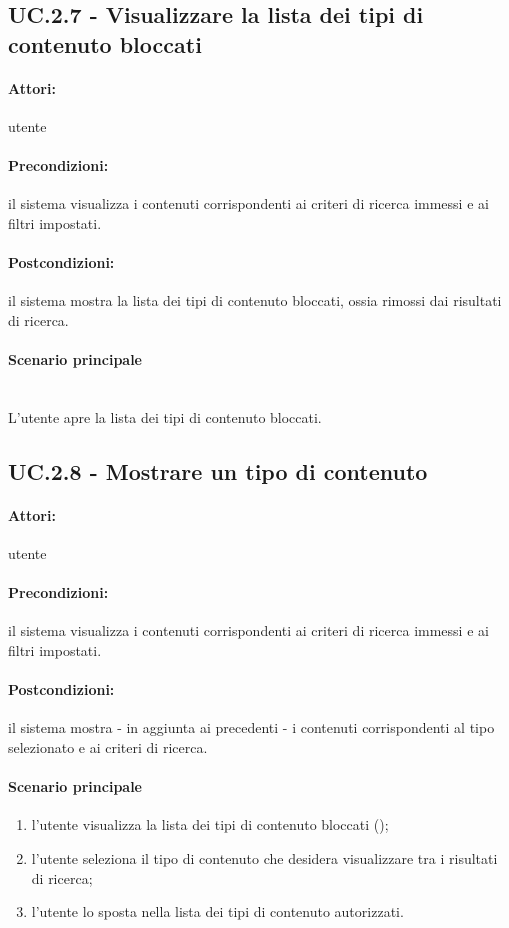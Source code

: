 \documentclass[10pt,a4paper,headinclude,footinclude,hidelinks]{scrreprt} %
\begin{document}
	\subsection[UC.2.7]{UC.2.7 - Visualizzare la lista dei tipi di contenuto bloccati}
	\label{sec:stage:ar:uc:2_7}
	\paragraph{Attori:} utente
	\paragraph{Precondizioni:} il sistema visualizza i contenuti corrispondenti ai criteri di ricerca immessi e ai filtri impostati.
	\paragraph{Postcondizioni:} il sistema mostra la lista dei tipi di contenuto bloccati, ossia rimossi dai risultati di ricerca.
	\paragraph{Scenario principale} \hfill \\
	L'utente apre la lista dei tipi di contenuto bloccati.

	\subsection[UC.2.8]{UC.2.8 - Mostrare un tipo di contenuto}
	\label{sec:stage:ar:uc:2_8}
	\paragraph{Attori:} utente
	\paragraph{Precondizioni:} il sistema visualizza i contenuti corrispondenti ai criteri di ricerca immessi e ai filtri impostati.
	\paragraph{Postcondizioni:} il sistema mostra - in aggiunta ai precedenti - i contenuti corrispondenti al tipo selezionato e ai criteri di ricerca.
	\paragraph{Scenario principale}
	\begin{enumerate}
	\item l'utente visualizza la lista dei tipi di contenuto bloccati ();
	\item l'utente seleziona il tipo di contenuto che desidera visualizzare tra i risultati di ricerca;
	\item l'utente lo sposta nella lista dei tipi di contenuto autorizzati.
	\end{enumerate}
\end{document}
